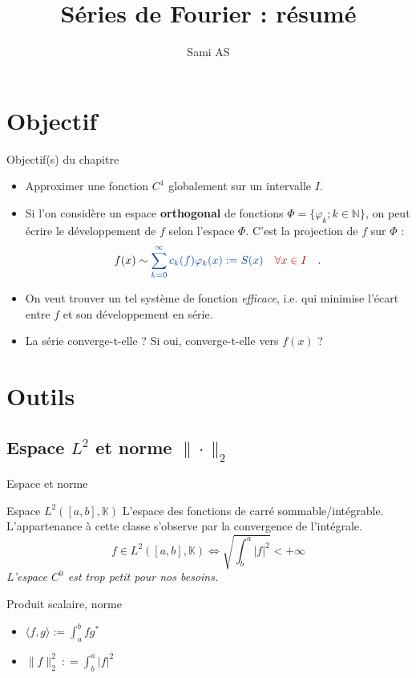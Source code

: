 \documentclass[9pt]{beamer}
\author{Sami AS}
\title{Séries de Fourier : résumé}
\begin{document}
\begin{frame}
\titlepage
\end{frame}



\section{Objectif}
\begin{frame}
\tableofcontents[currentsection]
\end{frame}
\begin{frame}{Objectif(s) du chapitre}
\begin{itemize}
\item Approximer une fonction $C^1$ globalement sur un intervalle $I$.
\item Si l'on considère un espace \textbf{orthogonal} de fonctions $\Phi = \{\varphi_k ; k\in \mathbb{N}\}$, on peut écrire le développement de $f$ selon l'espace $\Phi$. C'est la projection de $f$ sur $\Phi$ : 
$$f(x) \sim \bleu{\sum_{k=0} ^\infty c_k(f) \varphi_k(x):= S(x)} \quad \rouge{\forall x \in I} \quad  .$$

\item On veut trouver un tel système de fonction \textit{efficace}, i.e. qui minimise l'écart entre $f$ et son développement en série.
\item La série  converge-t-elle ? Si oui, converge-t-elle vers $f(x)$ ?
\end{itemize}
\end{frame}

\section{Outils}
\begin{frame}
\tableofcontents[currentsection]
\end{frame}
\subsection{Espace $L^2$ et norme $\| \cdot \| _2$}
\begin{frame}{Espace et norme}
\begin{block}{Espace $L^2([a,b], \mathbb{K})$}
L'espace des fonctions de carré sommable/intégrable. L'appartenance à cette classe s'observe par la convergence de l'intégrale.
$$ f \in L^2([a,b], \mathbb{K}) \iff \sqrt{\int_b ^a |f|^2} < +\infty $$
\textit{L'espace $C^0$ est trop petit pour nos besoins.}
\end{block}
\begin{block}{Produit scalaire, norme}
\begin{itemize}
\item $\langle f, g \rangle := \int_a ^b f  g^*$
\item $\|f\|_2 ^2 \ : = \int_b ^a |f|^2 $
\end{itemize}
\end{block}
\end{frame}
\end{document}
